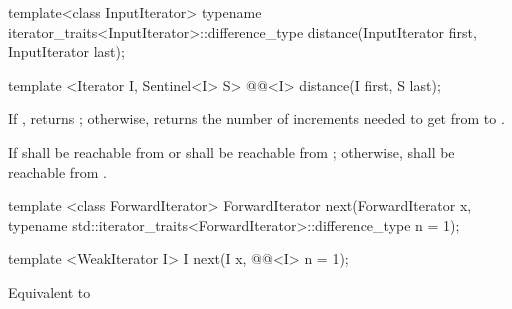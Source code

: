 %
\begin{removedblock}
\begin{itemdecl}
  template<class InputIterator>
      typename iterator_traits<InputIterator>::difference_type
         distance(InputIterator first, InputIterator last);
\end{itemdecl}
\end{removedblock}
\begin{addedblock}
\begin{itemdecl}
template <Iterator I, Sentinel<I> S>
  @@<I> distance(I first, S last);
\end{itemdecl}
\end{addedblock}

\begin{itemdescr}
\pnum
\effects

If , returns ; otherwise,
returns the number of increments needed to get from
to
.

\pnum
\requires
If   shall be reachable from
 or  shall be reachable from ; otherwise,
shall be reachable from
.
\end{itemdescr}

%
\begin{removedblock}
\begin{itemdecl}
template <class ForwardIterator>
  ForwardIterator next(ForwardIterator x,
    typename std::iterator_traits<ForwardIterator>::difference_type n = 1);
\end{itemdecl}
\end{removedblock}
\begin{addedblock}
\begin{itemdecl}
template <WeakIterator I>
  I next(I x, @@<I> n = 1);
\end{itemdecl}
\end{addedblock}

\begin{itemdescr}
\pnum
\effects Equivalent to 
\end{itemdescr}


